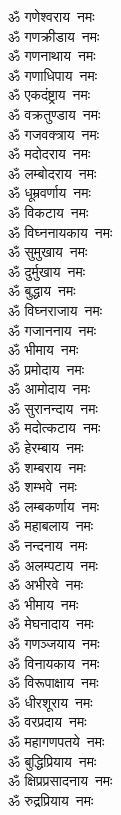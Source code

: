 \begin{multicols}{2}
\begin{flushleft}
ॐ गणेश्वराय~नमः\\
ॐ गणक्रीडाय~नमः\\
ॐ गणनाथाय~नमः\\
ॐ गणाधिपाय~नमः\\
ॐ एकदंष्ट्राय~नमः\\
ॐ वक्रतुण्डाय~नमः\\
ॐ गजवक्त्राय~नमः\\
ॐ मदोदराय~नमः\\
ॐ लम्बोदराय~नमः\\
ॐ धूम्रवर्णाय~नमः\hfill{}\\
ॐ विकटाय~नमः\\
ॐ विघ्ननायकाय~नमः\\
ॐ सुमुखाय~नमः\\
ॐ दुर्मुखाय~नमः\\
ॐ बुद्धाय~नमः\\
ॐ विघ्नराजाय~नमः\\
ॐ गजाननाय~नमः\\
ॐ भीमाय~नमः\\
ॐ प्रमोदाय~नमः\\
ॐ आमोदाय~नमः\hfill{}\\
ॐ सुरानन्दाय~नमः\\
ॐ मदोत्कटाय~नमः\\
ॐ हेरम्बाय~नमः\\
ॐ शम्बराय~नमः\\
ॐ शम्भवे~नमः\\
ॐ लम्बकर्णाय~नमः\\
ॐ महाबलाय~नमः\\
ॐ नन्दनाय~नमः\\
ॐ अलम्पटाय~नमः\\
ॐ अभीरवे~नमः\hfill{}\\
ॐ भीमाय~नमः\\
ॐ मेघनादाय~नमः\\
ॐ गणञ्जयाय~नमः\\
ॐ विनायकाय~नमः\\
ॐ विरूपाक्षाय~नमः\\
ॐ धीरशूराय~नमः\\
ॐ वरप्रदाय~नमः\\
ॐ महागणपतये~नमः\\
ॐ बुद्धिप्रियाय~नमः\\
ॐ क्षिप्रप्रसादनाय~नमः\hfill{}\\
ॐ रुद्रप्रियाय~नमः\\

\end{flushleft}
\end{multicols}
